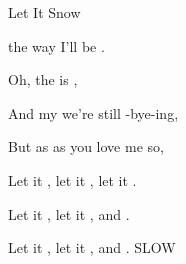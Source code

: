 \begin{SBSong}{Let It Snow}
\begin{SBVerse}
     the way  I'll be . 
  \end{SBVerse}
  \begin{SBVerse}
    Oh, the  is  ,
    
    And my  we're still -bye-ing,
    
    But as  as you love me so,
    
    Let it , let it , let it .
    
    Let it , let it , and .
    
    Let it , let it , and . SLOW
  \end{SBVerse}
\end{SBSong}
